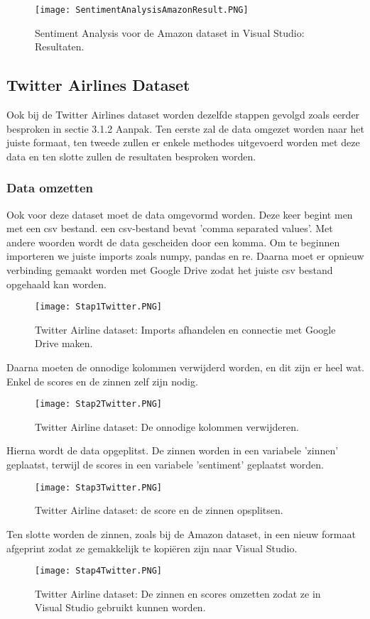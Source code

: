 \begin{figure}[!htbp]
    \texttt{[image: SentimentAnalysisAmazonResult.PNG]}
    \caption{\label{azuresentimentanalysisamazonresults}Sentiment Analysis voor de Amazon dataset in Visual Studio: Resultaten.}
\end{figure}
\FloatBarrier 

\subsection{Twitter Airlines Dataset}
\label{twitterdatasetazure}

Ook bij de Twitter Airlines dataset worden dezelfde stappen gevolgd zoals eerder besproken in sectie 3.1.2 Aanpak. Ten eerste zal de data omgezet worden naar het juiste formaat, ten tweede zullen er enkele methodes uitgevoerd worden met deze data en ten slotte zullen de resultaten besproken worden. 

\subsubsection{Data omzetten}
\label{twitterdatasetomzettenazure}
Ook voor deze dataset moet de data omgevormd worden. Deze keer begint men met een csv bestand. een csv-bestand bevat 'comma separated values'. Met andere woorden wordt de data gescheiden door een komma. Om te beginnen importeren we juiste imports zoals numpy, pandas en re. Daarna moet er opnieuw verbinding gemaakt worden met Google Drive zodat het juiste csv bestand opgehaald kan worden. 
\begin{figure}[!htbp]
    \texttt{[image: Stap1Twitter.PNG]}
    \caption{\label{azurestap1twitter}Twitter Airline dataset: Imports afhandelen en connectie met Google Drive maken.}
\end{figure}
\FloatBarrier 

Daarna moeten de onnodige kolommen verwijderd worden, en dit zijn er heel wat. Enkel de scores en de zinnen zelf zijn nodig.
\begin{figure}[!htbp]
    \texttt{[image: Stap2Twitter.PNG]}
    \caption{\label{azurestap2twitter}Twitter Airline dataset: De onnodige kolommen verwijderen.}
\end{figure}
\FloatBarrier 

Hierna wordt de data opgeplitst. De zinnen worden in een variabele 'zinnen' geplaatst, terwijl de scores in een variabele 'sentiment' geplaatst worden. 
\begin{figure}[!htbp]
    \texttt{[image: Stap3Twitter.PNG]}
    \caption{\label{azurestap3twitter}Twitter Airline dataset: de score en de zinnen opsplitsen.}
\end{figure}
\FloatBarrier
Ten slotte worden de zinnen, zoals bij de Amazon dataset, in een nieuw formaat afgeprint zodat ze gemakkelijk te kopiëren zijn naar Visual Studio. 
\begin{figure}[!htbp]
    \texttt{[image: Stap4Twitter.PNG]}
    \caption{\label{azurestap4twitter}Twitter Airline dataset: De zinnen en scores omzetten zodat ze in Visual Studio gebruikt kunnen worden.}
\end{figure}
\FloatBarrier 

